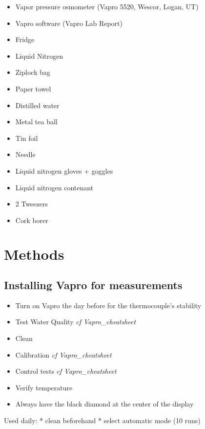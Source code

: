 \documentclass[
  12pt,
  american,
  a4paper,
  extrafontsizes,onecolumn,openright
  ]{memoir}
\providecommand{\tightlist}{%
  \setlength{\itemsep}{0pt}\setlength{\parskip}{0pt}}
\begin{document}
\begin{itemize}
\tightlist
\item
  Vapor pressure osmometer (Vapro 5520, Wescor, Logan, UT)
\item
  Vapro software (Vapro Lab Report)
\item
  Fridge
\item
  Liquid Nitrogen
\item
  Ziplock bag\\
\item
  Paper towel
\item
  Distilled water
\item
  Metal tea ball
\item
  Tin foil
\item
  Needle\\
\item
  Liquid nitrogen gloves + goggles
\item
  Liquid nitrogen contenant
\item
  2 Tweezers
\item
  Cork borer
\end{itemize}

\hypertarget{methods}{%
\section{Methods}\label{methods}}

\hypertarget{installing-vapro-for-measurements}{%
\subsection{Installing Vapro for measurements}\label{installing-vapro-for-measurements}}

\begin{itemize}
\tightlist
\item
  Turn on Vapro the day before for the thermocouple's stability
\item
  Test Water Quality \emph{cf Vapro\_cheatsheet}
\item
  Clean
\item
  Calibration \emph{cf Vapro\_cheatsheet}
\item
  Control tests \emph{cf Vapro\_cheatsheet}
\item
  Verify temperature
\item
  Always have the black diamond at the center of the display
\end{itemize}

Used daily:
* clean beforehand
* select automatic mode (10 runs)
\end{document}
